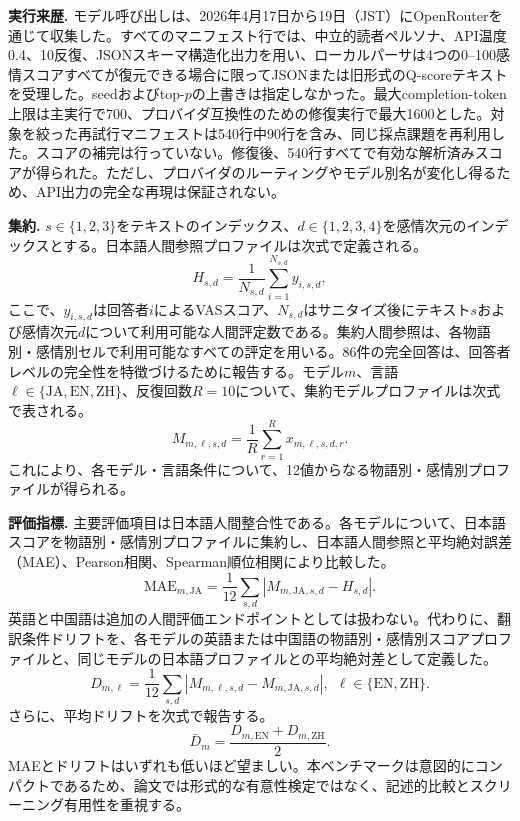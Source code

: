 \documentclass[lualatex,ja=standard,a4paper,11pt]{bxjsarticle}
\begin{document}
\textbf{実行来歴.}
モデル呼び出しは、2026年4月17日から19日（JST）にOpenRouterを通じて収集した。すべてのマニフェスト行では、中立的読者ペルソナ、API温度0.4、10反復、JSONスキーマ構造化出力を用い、ローカルパーサは4つの0--100感情スコアすべてが復元できる場合に限ってJSONまたは旧形式のQ-scoreテキストを受理した。seedおよびtop-$p$の上書きは指定しなかった。最大completion-token上限は主実行で700、プロバイダ互換性のための修復実行で最大1600とした。対象を絞った再試行マニフェストは540行中90行を含み、同じ採点課題を再利用した。スコアの補完は行っていない。修復後、540行すべてで有効な解析済みスコアが得られた。ただし、プロバイダのルーティングやモデル別名が変化し得るため、API出力の完全な再現は保証されない。

\textbf{集約.}
$s \in \{1,2,3\}$をテキストのインデックス、$d \in \{1,2,3,4\}$を感情次元のインデックスとする。日本語人間参照プロファイルは次式で定義される。
\begin{equation}
H_{s,d}=\frac{1}{N_{s,d}}\sum_{i=1}^{N_{s,d}} y_{i,s,d},
\end{equation}
ここで、$y_{i,s,d}$は回答者$i$によるVASスコア、$N_{s,d}$はサニタイズ後にテキスト$s$および感情次元$d$について利用可能な人間評定数である。集約人間参照は、各物語別・感情別セルで利用可能なすべての評定を用いる。86件の完全回答は、回答者レベルの完全性を特徴づけるために報告する。モデル$m$、言語$\ell \in \{\mathrm{JA},\mathrm{EN},\mathrm{ZH}\}$、反復回数$R=10$について、集約モデルプロファイルは次式で表される。
\begin{equation}
M_{m,\ell,s,d}=\frac{1}{R}\sum_{r=1}^{R} x_{m,\ell,s,d,r}.
\end{equation}
これにより、各モデル・言語条件について、12値からなる物語別・感情別プロファイルが得られる。

\textbf{評価指標.}
主要評価項目は日本語人間整合性である。各モデルについて、日本語スコアを物語別・感情別プロファイルに集約し、日本語人間参照と平均絶対誤差（MAE）、Pearson相関、Spearman順位相関により比較した。
\begin{equation}
\mathrm{MAE}_{m,\mathrm{JA}}=\frac{1}{12}\sum_{s,d}\left|M_{m,\mathrm{JA},s,d}-H_{s,d}\right|.
\end{equation}
英語と中国語は追加の人間評価エンドポイントとしては扱わない。代わりに、翻訳条件ドリフトを、各モデルの英語または中国語の物語別・感情別スコアプロファイルと、同じモデルの日本語プロファイルとの平均絶対差として定義した。
\begin{equation}
D_{m,\ell}=\frac{1}{12}\sum_{s,d}\left|M_{m,\ell,s,d}-M_{m,\mathrm{JA},s,d}\right|,~~
\ell \in \{\mathrm{EN},\mathrm{ZH}\}.
\end{equation}
さらに、平均ドリフトを次式で報告する。
\begin{equation}
\bar{D}_m=\frac{D_{m,\mathrm{EN}}+D_{m,\mathrm{ZH}}}{2}.
\end{equation}
MAEとドリフトはいずれも低いほど望ましい。本ベンチマークは意図的にコンパクトであるため、論文では形式的な有意性検定ではなく、記述的比較とスクリーニング有用性を重視する。
\end{document}

